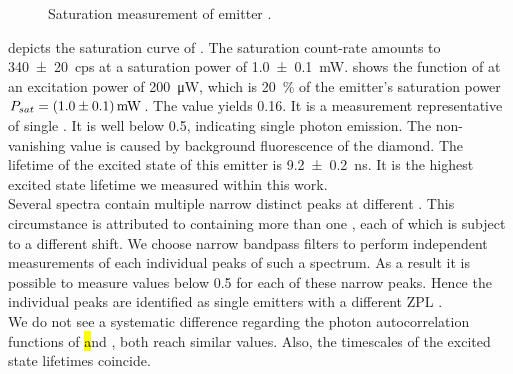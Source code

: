 		
		\begin{figure}[!htb]
			\centering
			\caption{Saturation measurement of emitter \embroad.}
			\label{fig::sat_Ir8}
		\end{figure}

		 depicts the saturation curve of \embroad.
		The saturation count-rate amounts to \SI[separate-uncertainty]{340\pm20}{cps} at a saturation power of \SI[separate-uncertainty]{1.0\pm0.1}{mW}.
		 shows the \gt function of \embroad at an excitation power of \SI{200}{\micro\W}, which is \SI{20}{\percent} of the emitter's saturation power $P_{sat}=\SI[separate-uncertainty]{1.0\pm0.1}{mW}$.
		The \gtz value yields \num{0.16}.
		It is a \gt measurement representative of single \sivs.
		It is well below \num{0.5}, indicating single photon emission.
		The non-vanishing \gtz value is caused by background fluorescence of the diamond.
		The lifetime of the excited state of this emitter is \SI[separate-uncertainty]{9.2\pm0.2}{ns}.
		It is the highest excited state lifetime we measured within this work.
		\\
		Several \nd \pl spectra contain multiple narrow distinct peaks at different \wls.
		This circumstance is attributed to \nds containing more than one \siv, each of which is subject to a different \ZPL \wl shift.
		We choose narrow bandpass filters to perform independent measurements of each individual peaks of such a spectrum.
		As a result it is possible to measure \gtz values below \num{0.5} for each of these narrow peaks.
		Hence the individual peaks are identified as single emitters with a different ZPL \cwl.
		\\
		We do not see a systematic difference regarding the photon autocorrelation functions of \hl and \vl, both reach similar \gtz values.
		Also, the timescales of the excited state lifetimes coincide.
